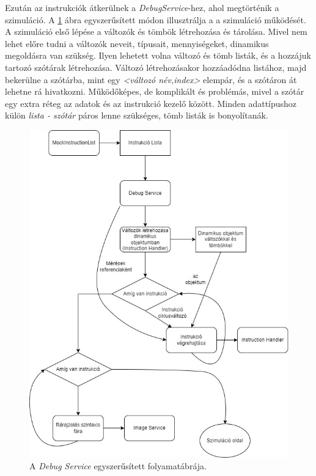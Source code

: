 Ezután az instrukciók átkerülnek a \textit{DebugService}-hez, ahol megtörténik a szimuláció.
A \ref{fig:debugflow} ábra egyszerűsített módon illusztrálja a a szimuláció működését. A szimuláció első lépése a változók és tömbök létrehozása és tárolása. Mivel nem lehet előre tudni a változók neveit, típusait, mennyiségeket, dinamikus megoldásra van szükség. Ilyen lehetett volna változó és tömb listák, és a hozzájuk tartozó szótárak létrehozása. Változó létrehozásakor hozzáadódna listához, majd bekerülne a szótárba, mint egy \textit{<változó név,index>} elempár, és a szótáron át lehetne rá hivatkozni. Működőképes, de komplikált és problémás, mivel a szótár egy extra réteg az adatok és az instrukció kezelő között. Minden adattípushoz külön \textit{lista - szótár} páros lenne szükséges, tömb listák is bonyolítanák.

\begin{figure}[h]
\centering
\includegraphics[scale=0.65]{images/SimpleDebug.jpg}
\caption{A \textit{Debug Service} egyszerűsített folyamatábrája.}
\label{fig:debugflow}
\end{figure}



